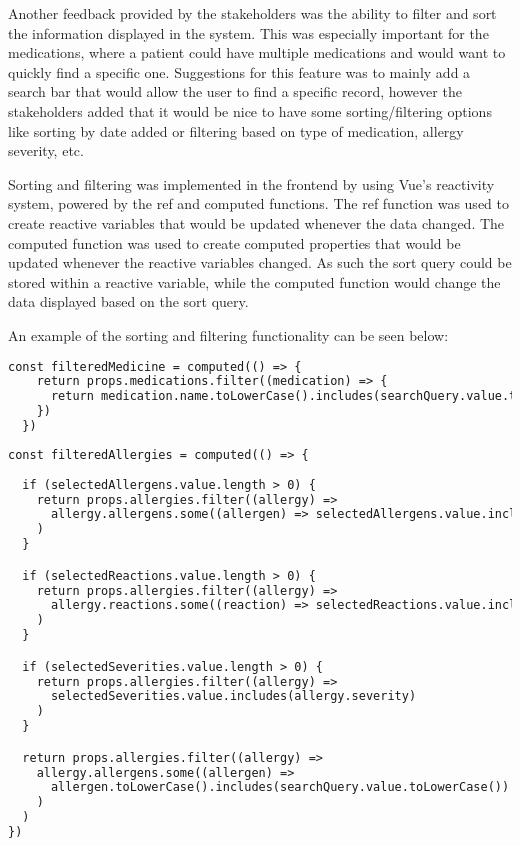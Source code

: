 Another feedback provided by the stakeholders was the ability to filter and sort the information displayed in the system. This was especially important for the medications, where a patient could have multiple medications and would want to quickly find a specific one. Suggestions for this feature was to mainly add a search bar that would allow the user to find a specific record, however the stakeholders added that it would be nice to have some sorting/filtering options like sorting by date added or filtering based on type of medication, allergy severity, etc.

Sorting and filtering was implemented in the frontend by using Vue's reactivity system, powered by the ref and computed functions. The ref function was used to create reactive variables that would be updated whenever the data changed. The computed function was used to create computed properties that would be updated whenever the reactive variables changed. As such the sort query could be stored within a reactive variable, while the computed function would change the data displayed based on the sort query.

An example of the sorting and filtering functionality can be seen below:

\begin{lstlisting}[language=HTML, caption=Medication Sorting and Filtering]
  const filteredMedicine = computed(() => {
    return props.medications.filter((medication) => {
      return medication.name.toLowerCase().includes(searchQuery.value.toLowerCase())
    })
  })
\end{lstlisting}

\begin{lstlisting}[language=HTML, caption=Allergies Sorting and Filtering]
  const filteredAllergies = computed(() => {
  
  if (selectedAllergens.value.length > 0) {
    return props.allergies.filter((allergy) =>
      allergy.allergens.some((allergen) => selectedAllergens.value.includes(allergen))
    )
  }

  if (selectedReactions.value.length > 0) {
    return props.allergies.filter((allergy) =>
      allergy.reactions.some((reaction) => selectedReactions.value.includes(reaction))
    )
  }

  if (selectedSeverities.value.length > 0) {
    return props.allergies.filter((allergy) =>
      selectedSeverities.value.includes(allergy.severity)
    )
  }  

  return props.allergies.filter((allergy) =>
    allergy.allergens.some((allergen) =>
      allergen.toLowerCase().includes(searchQuery.value.toLowerCase())
    )
  )
})  
\end{lstlisting}

